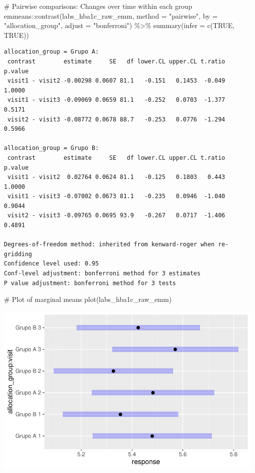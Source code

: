 \documentclass[
  12pt,
]{article}
\newenvironment{Shaded}{\begin{snugshade}}{\end{snugshade}}
\newcommand{\AttributeTok}[1]{\textcolor[rgb]{0.40,0.45,0.13}{#1}}
\newcommand{\CommentTok}[1]{\textcolor[rgb]{0.37,0.37,0.37}{#1}}
\newcommand{\ConstantTok}[1]{\textcolor[rgb]{0.56,0.35,0.01}{#1}}
\newcommand{\FunctionTok}[1]{\textcolor[rgb]{0.28,0.35,0.67}{#1}}
\newcommand{\NormalTok}[1]{\textcolor[rgb]{0.00,0.23,0.31}{#1}}
\newcommand{\SpecialCharTok}[1]{\textcolor[rgb]{0.37,0.37,0.37}{#1}}
\newcommand{\StringTok}[1]{\textcolor[rgb]{0.13,0.47,0.30}{#1}}
\begin{document}
\begin{Shaded}
\begin{Highlighting}[]
\CommentTok{\# Pairwise comparisons: Changes over time within each group}
\NormalTok{emmeans}\SpecialCharTok{::}\FunctionTok{contrast}\NormalTok{(labs\_hba1c\_raw\_emm,}
\AttributeTok{method =} \StringTok{"pairwise"}\NormalTok{, }\AttributeTok{by =} \StringTok{"allocation\_group"}\NormalTok{,}
\AttributeTok{adjust =} \StringTok{"bonferroni"}\NormalTok{) }\SpecialCharTok{\%\textgreater{}\%} \FunctionTok{summary}\NormalTok{(}\AttributeTok{infer =} \FunctionTok{c}\NormalTok{(}\ConstantTok{TRUE}\NormalTok{, }\ConstantTok{TRUE}\NormalTok{))}
\end{Highlighting}
\end{Shaded}

\begin{verbatim}
allocation_group = Grupo A:
 contrast        estimate     SE   df lower.CL upper.CL t.ratio p.value
 visit1 - visit2 -0.00298 0.0607 81.1   -0.151   0.1453  -0.049  1.0000
 visit1 - visit3 -0.09069 0.0659 81.1   -0.252   0.0703  -1.377  0.5171
 visit2 - visit3 -0.08772 0.0678 88.7   -0.253   0.0776  -1.294  0.5966

allocation_group = Grupo B:
 contrast        estimate     SE   df lower.CL upper.CL t.ratio p.value
 visit1 - visit2  0.02764 0.0624 81.1   -0.125   0.1803   0.443  1.0000
 visit1 - visit3 -0.07002 0.0673 81.1   -0.235   0.0946  -1.040  0.9044
 visit2 - visit3 -0.09765 0.0695 93.9   -0.267   0.0717  -1.406  0.4891

Degrees-of-freedom method: inherited from kenward-roger when re-gridding 
Confidence level used: 0.95 
Conf-level adjustment: bonferroni method for 3 estimates 
P value adjustment: bonferroni method for 3 tests 
\end{verbatim}

\begin{Shaded}
\begin{Highlighting}[]
\CommentTok{\# Plot of marginal means}
\FunctionTok{plot}\NormalTok{(labs\_hba1c\_raw\_emm)}
\end{Highlighting}
\end{Shaded}

\includegraphics{Outcomes_files/figure-pdf/labs_hba1c_raw_emm-1.pdf}
\end{document}

